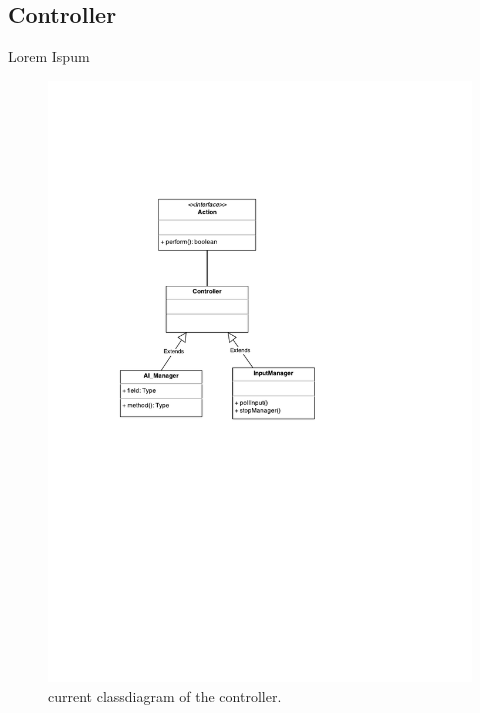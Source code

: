 \subsection{Controller}
Lorem Ispum

\begin{figure}[htbp]
	\centering
	\includegraphics[width=\textwidth]{controller-classdiagram.pdf}
	\caption{current classdiagram of the controller.}
\end{figure}

\FloatBarrier